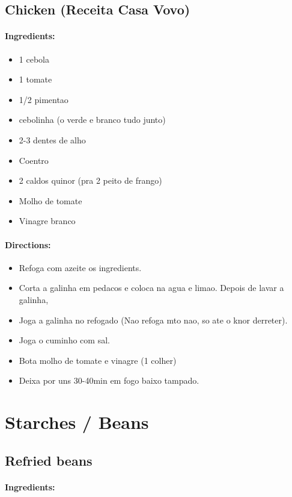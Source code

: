 \documentclass{article}
\begin{document}
\subsection{Chicken (Receita Casa Vovo)}

\paragraph{Ingredients:}

\begin{itemize}
	\item 1 cebola 
	\item 1 tomate 
	\item 1/2 pimentao 
	\item cebolinha (o verde e branco tudo junto) 
	\item 2-3 dentes de alho 
	\item Coentro 
	\item 2 caldos quinor (pra 2 peito de frango) 
	\item Molho de tomate 
	\item Vinagre branco
\end{itemize}

\paragraph{Directions:}
\begin{itemize}
	\item Refoga com azeite os ingredients.
	\item Corta a galinha em pedacos e coloca na agua e limao. Depois de lavar a galinha,
	\item Joga a galinha no refogado (Nao refoga mto nao, so ate o knor derreter). 
	\item Joga o cuminho com sal.
	\item Bota molho de tomate e vinagre (1 colher)
	\item Deixa por uns 30-40min em fogo baixo tampado.
\end{itemize}

\section{Starches / Beans}

\subsection{Refried beans}

\paragraph{Ingredients:}
\end{document}
